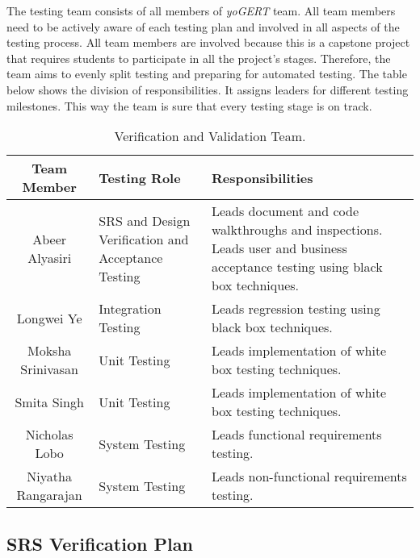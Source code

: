 \documentclass[12pt, titlepage]{article}
\begin{document}
The testing team consists of all members of \emph{yoGERT} team. All team members
need to be actively aware of each testing plan and involved in all aspects of the
testing process. All team members are involved because this is a capstone project
that requires students to participate in all the project's stages. Therefore, the
team aims to evenly split testing and preparing for automated testing. The table
below shows the division of responsibilities. It assigns leaders for different
testing milestones. This way the team is sure that every testing stage is on
track.  
\newpage
\begin{table}[h!]
    \begin{tabular}{|c|p{50mm}|p{50mm}| }
 \hline
 \textbf{Team Member} & \textbf{Testing Role} & \textbf{Responsibilities}  \\ 
 \hline
 Abeer Alyasiri & SRS and Design Verification and Acceptance Testing & Leads document and code walkthroughs and inspections. Leads user and business acceptance testing using black box techniques. \\ 
 Longwei Ye & Integration Testing & Leads regression testing using black box techniques. \\ 
 Moksha Srinivasan & Unit Testing & Leads implementation of white box testing techniques. \\
 Smita Singh & Unit Testing & Leads implementation of white box testing techniques. \\
 Nicholas Lobo & System Testing & Leads functional requirements testing. \\
 Niyatha Rangarajan & System Testing & Leads non-functional requirements testing. \\
 \hline
\end{tabular}
    \caption{Verification and Validation Team.}
    \label{tab:my_label}
\end{table}

\subsection{SRS Verification Plan}
\end{document}
